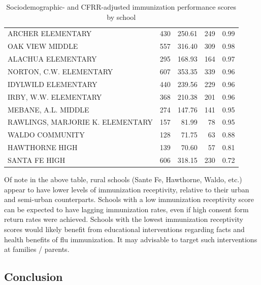\begin{table}[H]
\begin{table}[ht]
{\begin{tabular}{lrrrr}
  ARCHER ELEMENTARY  & 430 & 250.61 & 249 & 0.99 \\ 
  OAK VIEW MIDDLE  & 557 & 316.40 & 309 & 0.98 \\ 
  ALACHUA ELEMENTARY & 295 & 168.93 & 164 & 0.97 \\ 
  NORTON, C.W. ELEMENTARY & 607 & 353.35 & 339 & 0.96 \\ 
  IDYLWILD ELEMENTARY & 440 & 239.56 & 229 & 0.96 \\ 
  IRBY, W.W. ELEMENTARY & 368 & 210.38 & 201 & 0.96 \\ 
  MEBANE, A.L. MIDDLE  & 274 & 147.76 & 141 & 0.95 \\ 
  RAWLINGS, MARJORIE K. ELEMENTARY & 157 & 81.99 &  78 & 0.95 \\ 
  WALDO COMMUNITY  & 128 & 71.75 &  63 & 0.88 \\ 
  HAWTHORNE HIGH  & 139 & 70.60 &  57 & 0.81 \\ 
  SANTA FE HIGH  & 606 & 318.15 & 230 & 0.72 \\ 
   \hline
\end{tabular}
}
\caption{Sociodemographic- and CFRR-adjusted immunization performance scores by school} 
\end{table}\end{table}


Of note in the above table, rural schools (Sante Fe, Hawthorne, Waldo, etc.) appear to have lower levels of immunization receptivity, relative to their urban and semi-urban counterparts.  Schools with a low immunization receptivity score can be expected to have lagging immunization rates, even if high consent form return rates were achieved.  Schools with the lowest immunization receptivity scores would likely benefit from educational interventions regarding facts and health benefits of flu immunization. It may advisable to target such interventions at families / parents. 



\begin{center}
\section*{Conclusion}
\end{center}

